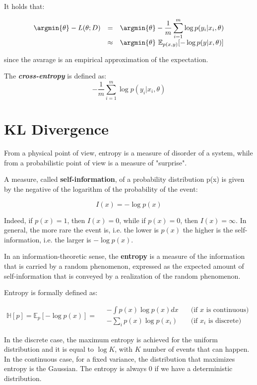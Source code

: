 It holds that:

$$
\begin{array}{rcl}
    \argmin{\theta} - L(\theta; D) &
    = & \argmin{\theta} - \dfrac 1m \displaystyle\sum_{i=1}^m \log p(y_i | x_i, \theta) \\
    & \approx & \argmin{\theta}\ \mathbb{E}_{p(x,y)}[-\log p(y | x, \theta)]
\end{array}
$$

since the avarage is an empirical approximation of the expectation.

\begin{definitionblock}
    The \textbf{\textit{cross-entropy}} is defined as:
    $$
    - \dfrac 1m \sum_{i = 1}^m \log p(y_i | x_i, \theta)
    $$
\end{definitionblock}

\section{KL Divergence}

From a physical point of view, entropy is a measure of disorder of a system, while from a probabilistic point of view is a measure of "surprise".

A measure, called \textbf{self-information}, of a probability distribution {p(x)} is given by the negative of the logarithm of the probability of the event:

$$
I(x) = - \log p(x)
$$

Indeed, if $p(x) = 1$, then $I(x) = 0$, while if $p(x) = 0$, then $I(x) = \infty$. In general, the more rare the event is, i.e. the lower is $p(x)$ the higher is the self-information, i.e. the larger is $- \log p(x)$.

In an information-theoretic sense, the \textbf{entropy} is a measure of the information that is carried by a random phenomenon, expressed as the expected amount of self-information that is conveyed by a realization of the random phenomenon.

Entropy is formally defined as:

$$
\mathbb{H}[p] = \mathbb{E}_{p}[-\log p(x)] = \quad 
\begin{array}{ll}
- \int p(x) \log p(x) dx & \quad \text{(if } x \text{ is continuous)} \\[10pt]
- \sum_i p(x) \log p(x_i) & \quad \text{(if } x_i \text{ is discrete)}
\end{array}
$$

In the discrete case, the maximum entropy is achieved for the uniform distribution and it is equal to $\log K$, with $K$ number of events that can happen. In the continuous case, for a fixed variance, the distribution that maximizes entropy is the Gaussian. The entropy is always 0 if we have a deterministic distribution.

